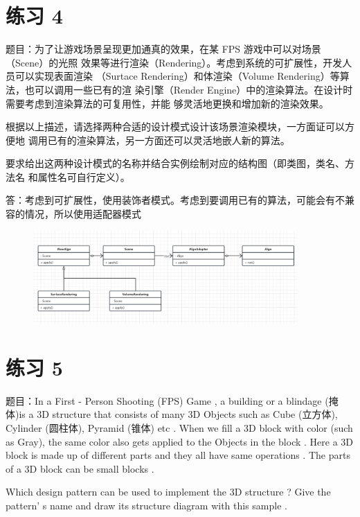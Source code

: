 \documentclass{article}
\begin{document}
\section*{练习 4}

题目：为了让游戏场景呈现更加通真的效果，在某 FPS 游戏中可以对场景（Scene）的光照
效果等进行渲染（Rendering）。考虑到系统的可扩展性，开发人员可以实现表面渲染
（Surtace Rendering）和体渲染（Volume Rendering）等算法，也可以调用一些已有的渲
染引擎（Render Engine）中的渲染算法。在设计时需要考虑到渲染算法的可复用性，并能
够灵活地更换和增加新的渲染效果。

根据以上描述，请选择两种合适的设计模式设计该场景渲染模块，一方面证可以方便地
调用已有的渲染算法，另一方面还可以灵活地嵌人新的算法。

要求给出这两种设计模式的名称并结合实例绘制对应的结构图（即类图，类名、方法名
和属性名可自行定义）。

\vspace{1em}

答：考虑到可扩展性，使用装饰者模式。考虑到要调用已有的算法，可能会有不兼容的情况，所以使用适配器模式

\begin{figure}[H]
    \centering
    \includegraphics[width=0.9\textwidth]{UML4.png}
\end{figure} 


\section*{练习 5}

题目：In a First - Person Shooting (FPS) Game , a building or a blindage (掩体)is a 3D
structure that consists of many 3D Objects such as Cube (立方体), Cylinder (圆柱体), Pyramid (锥体) etc . When we fill a 3D block with color (such as Gray), the same color
also gets applied to the Objects in the block . Here a 3D block is made up of different
parts and they all have same operations . The parts of a 3D block can be small blocks .

Which design pattern can be used to implement the 3D structure ? Give the pattern’
s name and draw its structure diagram with this sample .
\end{document}
